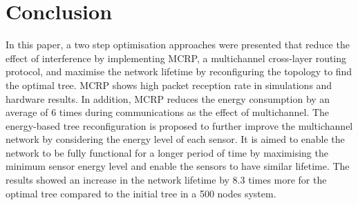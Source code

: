 \section{Conclusion}
\label{Conclusion}

In this paper, a two step optimisation approaches were presented that reduce the effect of interference by implementing MCRP, a multichannel cross-layer routing protocol, and maximise the network lifetime by reconfiguring the topology to find the optimal tree. 
MCRP shows high packet reception rate in simulations and hardware results. In addition, MCRP reduces the energy consumption by an average of 6 times during communications as the effect of multichannel.
The energy-based tree reconfiguration is proposed to further improve the multichannel network by considering the energy level of each sensor. 
It is aimed to enable the network to be fully functional for a longer period of time by maximising the minimum sensor energy level and enable the sensors to have similar lifetime.
The results showed an increase in the network lifetime by 8.3 times more for the optimal tree compared to the initial tree in a 500 nodes system.